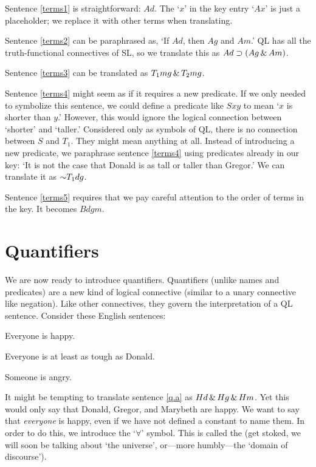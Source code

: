 Sentence \ref{terms1} is straightforward: $Ad$. The `$x$' in the key entry `$Ax$' is just a placeholder; we replace it with other terms when translating.

Sentence \ref{terms2} can be paraphrased as, `If $Ad$, then $Ag$ and $Am$.' QL has all the truth-functional connectives of SL, so we translate this as $Ad \supset (Ag \,\&\, Am)$.

Sentence \ref{terms3} can be translated as $T_1mg \,\&\, T_2mg$.

Sentence \ref{terms4} might seem as if it requires a new predicate. If we only needed to symbolize this sentence, we could define a predicate like $Sxy$ to mean `$x$ is shorter than $y$.' However, this would ignore the logical connection between `shorter' and `taller.' Considered only as symbols of QL, there is no connection between $S$ and $T_1$. They might mean anything at all. Instead of introducing a new predicate, we paraphrase sentence \ref{terms4} using predicates already in our key: `It is not the case that Donald is as tall or taller than Gregor.' We can translate it as $\enot T_1dg$.

Sentence \ref{terms5} requires that we pay careful attention to the order of terms in the key. It becomes $Bdgm$.






\section{Quantifiers}
We are now ready to introduce quantifiers. Quantifiers (unlike names and predicates) are a new kind of logical connective (similar to a unary connective like negation). Like other connectives, they govern the interpretation of a QL sentence.  Consider these English sentences:
\begin{earg}
\item[\ex{q.a}] Everyone is happy.
\item[\ex{q.ac}] Everyone is at least as tough as Donald.
\item[\ex{q.e}] Someone is angry.
\end{earg}

It might be tempting to translate sentence \ref{q.a} as $Hd \,\&\, Hg \,\&\, Hm$. Yet this would only say that Donald, Gregor, and Marybeth are happy. We want to say that \emph{everyone} is happy, even if we have not defined a constant to name them. In order to do this, we introduce the `$\forall$' symbol. This is called the  {\color{black}(get stoked, we will soon be talking about `the universe', or---more humbly---the `domain of discourse')}. 

